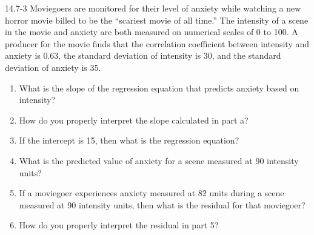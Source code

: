 \begin{exsol@exercise}{14.7-3}
Moviegoers are monitored for their level of anxiety while watching a new horror movie billed to be the “scariest movie of all time.” The intensity of a scene in the movie and anxiety are both measured on numerical scales of 0 to 100. A producer for the movie finds that the correlation coefficient between intensity and anxiety is 0.63, the standard deviation of intensity is 30, and the standard deviation of anxiety is 35.

\begin{enumerate}
  \item What is the slope of the regression equation that predicts anxiety based on intensity?
  \item	How do you properly interpret the slope calculated in part a?
  \item	If the intercept is 15, then what is the regression equation?
  \item	What is the predicted value of anxiety for a scene measured at 90 intensity \\ units?
  \item	If a moviegoer experiences anxiety measured at 82 units during a scene measured at 90 intensity units, then what is the residual for that moviegoer?
  \item	How do you properly interpret the residual in part 5?
\end{enumerate}



\end{exsol@exercise}
